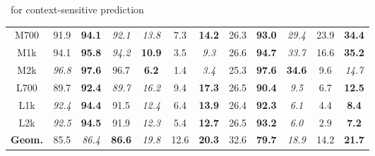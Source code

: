 \documentclass[first=dgreen,second=purple,logo=yellowexc]{aaltoslides}
\begin{document}
\begin{frame}{\spin\ for context-sensitive prediction}
\begin{table}[t]
\begin{tabular}{|@{  }c@{  }|@{}c@{  }c@{  }c@{}|@{}c@{  }c@{  }c@{}|@{}c@{ }c@{}|@{}c@{  }c@{  }c@{}|}
		M700  & {91.9} & \textbf{94.1} & \em{92.1} & \em{13.8} & {7.3} & \textbf{14.2}  & {26.3} & \textbf{93.0} & \em{29.4} & {23.9} & \textbf{34.4} \\ 
		M1k & {94.1} & \textbf{95.8} & \em{94.2} & \textbf{10.9} & {3.5} & \em{9.3}   & {26.6} & \textbf{94.7} & \em{33.7} & {16.6} & \textbf{35.2} \\ 
		M2k & \em{96.8} & \textbf{97.6} & {96.7} & \textbf{6.2} & {1.4} & \em{3.4}    & {25.3} & \textbf{97.6} & \textbf{34.6} & {9.6} & \em{14.7} \\ 
		L700  & {89.7} & \textbf{92.4} & \em{89.7} & \em{16.2} & {9.4} & \textbf{17.3}  & {26.5} & \textbf{90.4} & \em{9.5} & {6.7} & \textbf{12.5} \\ 
		L1k & \em{92.4} & \textbf{94.4} & {91.5} & \em{12.4} & {6.4} & \textbf{13.9}  & {26.4} & \textbf{92.3} & \em{6.1} & {4.4} & \textbf{8.4} \\ 
		L2k & \em{92.5} & \textbf{94.5} & {91.9} & \em{12.3} & {5.4} & \textbf{12.7}  & {26.5} & \textbf{93.2} & \em{6.0} & {2.9} & \textbf{7.2} \\ \hline
		\textbf{Geom.}  & {85.5} & \em{86.4} & \textbf{86.6} & \em{19.8} & {12.6} & \textbf{20.3} & {32.6} & \textbf{79.7} & \em{18.9} & {14.2} & \textbf{21.7} \\
		\hline
		\end{tabular}
		\label{table_global_res_svm}
		\end{table}
\end{frame}
\end{document}
